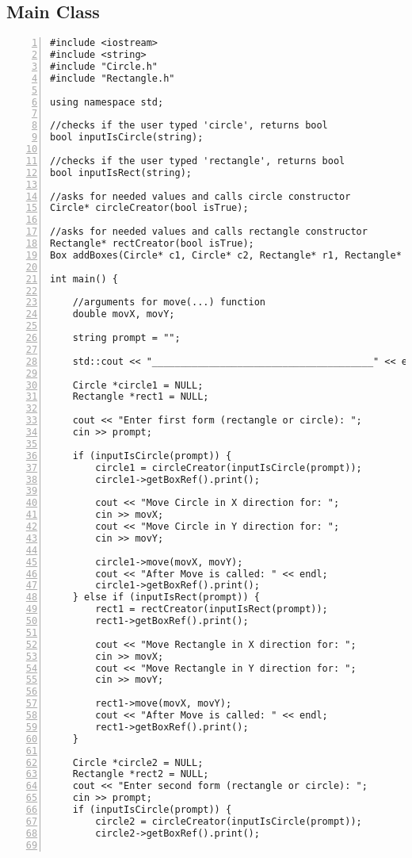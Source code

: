 \documentclass{llncs}
\begin{document}
\subsection{Main Class}
\begin{lstlisting}[basicstyle=\footnotesize\ttfamily, numbers=left, stepnumber=1, numberstyle = \normalsize]
#include <iostream>
#include <string>
#include "Circle.h"
#include "Rectangle.h"

using namespace std; 

//checks if the user typed 'circle', returns bool
bool inputIsCircle(string);

//checks if the user typed 'rectangle', returns bool
bool inputIsRect(string);

//asks for needed values and calls circle constructor
Circle* circleCreator(bool isTrue);

//asks for needed values and calls rectangle constructor
Rectangle* rectCreator(bool isTrue);
Box addBoxes(Circle* c1, Circle* c2, Rectangle* r1, Rectangle* r2); 

int main() {

	//arguments for move(...) function
	double movX, movY;

	string prompt = "";

	std::cout << "_______________________________________" << endl; 

	Circle *circle1 = NULL;
	Rectangle *rect1 = NULL;

	cout << "Enter first form (rectangle or circle): ";
	cin >> prompt;

	if (inputIsCircle(prompt)) {
		circle1 = circleCreator(inputIsCircle(prompt));
		circle1->getBoxRef().print();

		cout << "Move Circle in X direction for: ";
		cin >> movX;
		cout << "Move Circle in Y direction for: ";
		cin >> movY;

		circle1->move(movX, movY);
		cout << "After Move is called: " << endl;
		circle1->getBoxRef().print();
	} else if (inputIsRect(prompt))	{
		rect1 = rectCreator(inputIsRect(prompt));
		rect1->getBoxRef().print();

		cout << "Move Rectangle in X direction for: ";
		cin >> movX;
		cout << "Move Rectangle in Y direction for: ";
		cin >> movY;

		rect1->move(movX, movY);
		cout << "After Move is called: " << endl;
		rect1->getBoxRef().print();
	}

	Circle *circle2 = NULL;
	Rectangle *rect2 = NULL;
	cout << "Enter second form (rectangle or circle): ";
	cin >> prompt;
	if (inputIsCircle(prompt)) {
		circle2 = circleCreator(inputIsCircle(prompt));
		circle2->getBoxRef().print();


\end{lstlisting}
\end{document}
